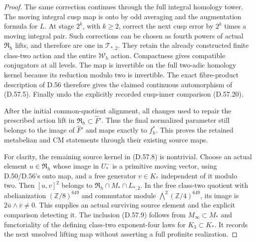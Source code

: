 \begin{proof}
The same correction continues through the
full integral homology tower. The moving
integral cusp map is onto by odd averaging
and the augmentation formula for \(L\).
At stage \(2^k\), with \(k\geq2\), correct
the next cusp error by \(2^k\) times a
moving integral pair. Such corrections can
be chosen as fourth powers of actual
\(\mathfrak R_h\) lifts, and therefore
are one in \(\mathcal T_{*,2}\). They retain
the already constructed finite class-two
action and the entire \(\mathcal W_h\)
action. Compactness gives compatible
conjugators at all levels. The map is
invertible on the full two-adic homology
kernel because its reduction modulo two
is invertible. The exact fibre-product
description of D.56 therefore gives the
claimed continuous automorphism of (D.57.5).
Finally undo the explicitly recorded
cusp-inner comparison (D.57.20).

After the initial common-quotient alignment,
all changes used to repair the prescribed
action lift in \(\mathfrak R_h\subset\widehat F'\).
Thus the final normalized parameter still
belongs to the image of \(\widehat F'\)
and maps exactly to \(f_h^*\). This proves
the retained metabelian and CM statements
through their existing source maps.

For clarity, the remaining source kernel
in (D.57.8) is nontrivial. Choose an actual
element \(u\in\mathfrak R_h\) whose image
in \(U_*^-\) is a primitive moving vector,
using D.50/D.56's onto map, and a free
generator \(v\in K_*\) independent of it
modulo two. Then \([u,v]^2\) belongs to
\(\mathfrak R_h\cap M_*\cap L_{*,2}\).
In the free class-two quotient with
abelianization \((\mathbb Z/8)^{649}\)
and commutator module
\(\bigwedge^2(\mathbb Z/4)^{649}\), its
image is \(2\bar u\wedge\bar v\ne0\).
This supplies an actual surviving source
element and the explicit comparison detecting
it. The inclusion (D.57.9) follows from
\(M_\infty\subset M_*\) and functoriality
of the defining class-two exponent-four
laws for \(K_3\subset K_*\). It records
the next unsolved lifting map without
asserting a full profinite realization.
\end{proof}

